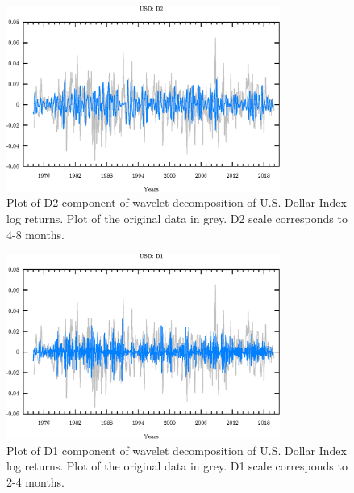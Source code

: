 \begin{figure}
\begin{center}
\includegraphics[width=0.8\textwidth]{./code/plot/usd_wr_D2.eps}
\caption{Plot of D2 component of wavelet decomposition of U.S. Dollar Index log returns. 
	Plot of the original data in grey. D2 scale corresponds to 4-8 months.}
\label{fig:usd-wr-d2}
\end{center}
\end{figure}

\begin{figure}
\begin{center}
\includegraphics[width=0.8\textwidth]{./code/plot/usd_wr_D1.eps}
\caption{Plot of D1 component of wavelet decomposition of U.S. Dollar Index log returns. 
	Plot of the original data in grey. D1 scale corresponds to 2-4 months.}
\label{fig:usd-wr-d1}
\end{center}
\end{figure}

